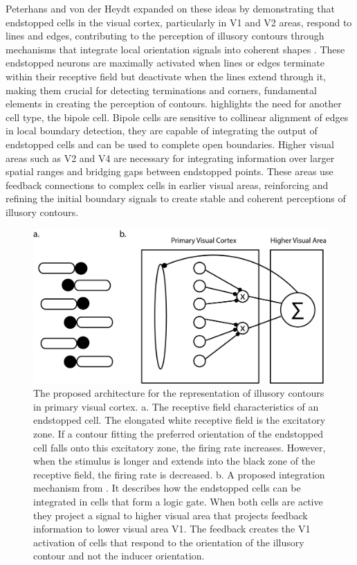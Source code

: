 \documentclass[12pt]{article}
\begin{document}
Peterhans and von der Heydt expanded on these ideas by demonstrating that endstopped cells in the visual cortex, particularly in V1 and V2 areas, respond to lines and edges, contributing to the perception of illusory contours through mechanisms that integrate local orientation signals into coherent shapes \autocite{grossbergTextureSegregationSurface1998}. These endstopped neurons are maximally activated when lines or edges terminate within their receptive field but deactivate when the lines extend through it, making them crucial for detecting terminations and corners, fundamental elements in creating the perception of contours. \textcite{grossbergRoleIllusoryContours1987} highlights the need for another cell type, the bipole cell. Bipole cells are sensitive to collinear alignment of edges in local boundary detection, they are capable of integrating the output of endstopped cells and can be used to complete open boundaries. Higher visual areas such as V2 and V4 are necessary for integrating information over larger spatial ranges and bridging gaps between endstopped points. These areas use feedback connections to complex cells in earlier visual areas, reinforcing and refining the initial boundary signals to create stable and coherent perceptions of illusory contours.
\begin{figure}[H]
  \centering
  \includegraphics[width=1.0 \textwidth]{adjusted_figures/endstop_mechanism.png}
  \caption{The proposed architecture for the representation of illusory contours in primary visual cortex. a. The receptive field characteristics of an endstopped cell. The elongated white receptive field is the excitatory zone. If a contour fitting the preferred orientation of the endstopped cell falls onto this excitatory zone, the firing rate increases. However, when the stimulus is longer and extends into the black zone of the receptive field, the firing rate is decreased. b. A proposed integration mechanism from \textcite{sorianoAbuttingGratingIllusion1996}. It describes how the endstopped cells can be integrated in cells that form a logic gate. When both cells are active they project a signal to higher visual area that projects feedback information to lower visual area V1. The feedback creates the V1 activation of cells that respond to the orientation of the illusory contour and not the inducer orientation.}
  \label{fig:endstop_mechanism}
\end{figure}
\end{document}
